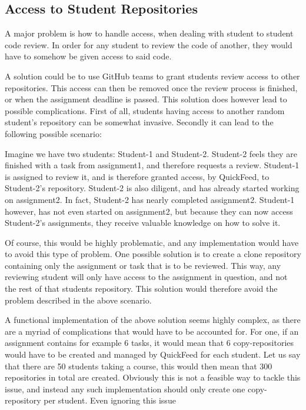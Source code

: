 \subsection{Access to Student Repositories}

A major problem is how to handle access, when dealing with student to student code review.
In order for any student to review the code of another, they would have to somehow be given access to said code.

A solution could be to use GitHub teams to grant students review access to other repositories.
This access can then be removed once the review process is finished, or when the assignment deadline is passed.
This solution does however lead to possible complications.
First of all, students having access to another random student's repository can be somewhat invasive.
Secondly it can lead to the following possible scenario:

Imagine we have two students: Student-1 and Student-2.
Student-2 feels they are finished with a task from assignment1, and therefore requests a review.
Student-1 is assigned to review it, and is therefore granted access, by QuickFeed, to Student-2's repository.
Student-2 is also diligent, and has already started working on assignment2.
In fact, Student-2 has nearly completed assignment2.
Student-1 however, has not even started on assignment2, but because they can now access Student-2's assignments, they receive valuable knowledge on how to solve it.

Of course, this would be highly problematic, and any implementation would have to avoid this type of problem.
One possible solution is to create a clone repository containing only the assignment or task that is to be reviewed. 
This way, any reviewing student will only have access to the assignment in question, and not the rest of that students repository.
This solution would therefore avoid the problem described in the above scenario.

A functional implementation of the above solution seems highly complex, as there are a myriad of complications that would have to be accounted for.
For one, if an assignment contains for example 6 tasks, it would mean that 6 copy-repositories would have to be created and managed by QuickFeed for each student.
Let us say that there are 50 students taking a course, this would then mean that 300 repositories in total are created.
Obviously this is not a feasible way to tackle this issue, and instead any such implementation should only create one copy-repository per student.
Even ignoring this issue 

